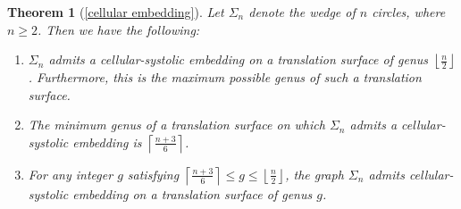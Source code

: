 \documentclass[11pt]{amsart}
\theoremstyle{plain}
\newtheorem*{repthm}{Theorem}
\theoremstyle{definition}
\theoremstyle{remark}
\numberwithin{equation}{section}
\numberwithin{figure}{section}
\begin{document}
\begin{repthm}[\ref{cellular embedding}]
Let \( \Sigma_n \) denote the wedge of \( n \) circles, where \( n \geq 2 \). Then we have the following:
\begin{enumerate}
    \item $\Sigma_n$ admits a cellular-systolic embedding on a translation surface of genus $\left\lfloor \frac{n}{2} \right\rfloor$. Furthermore, this is the maximum possible genus of such a translation surface.
    
    \item The minimum genus of a translation surface on which $\Sigma_n$ admits a cellular-systolic embedding is \( \left\lceil \frac{n+3}{6} \right\rceil \).
    
    \item For any integer \( g \) satisfying $\left\lceil \frac{n+3}{6} \right\rceil \leq g \leq \left\lfloor \frac{n}{2} \right\rfloor$, the graph \( \Sigma_n \) admits cellular-systolic embedding on a translation surface of genus \( g \).
\end{enumerate}
\end{repthm}
\end{document}
